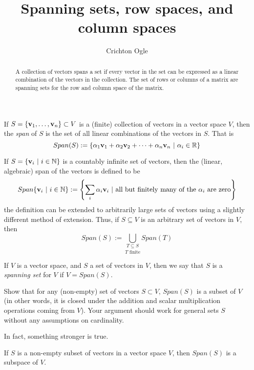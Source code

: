 \documentclass{ximera}
\title{Spanning sets, row spaces, and column spaces}
\author{Crichton Ogle}
\begin{document}
\begin{abstract}
  A collection of vectors spans a set if every vector in the set can
  be expressed as a linear combination of the vectors in the
  collection. The set of rows or columns of a matrix are spanning sets for the row and column space of the matrix.
\end{abstract}
\maketitle

If $S = \{{\bf v}_1,\dots, {\bf v}_n\}\subset V$ is a (finite) collection of vectors in a vector space $V$, then the {\it span} of $S$ is the set of all linear combinations of the vectors in $S$. That is
\[
Span(S) := \{\alpha_1{\bf v}_1 + \alpha_2{\bf v}_2 +\dots +\alpha_n{\bf v}_n\ |\ \alpha_i\in\mathbb R\}
\] 

\begin{remark} If $S = \{{\bf v}_i\ |\ i\in\mathbb N\}$ is a countably infinite set of vectors, then the (linear, algebraic) span of the vectors is defined to be
\[
Span\{{\bf v}_i\ |\ i\in\mathbb N\} := \left\{\sum_i\alpha_i{\bf v}_i\ |\ \text{all but finitely many of the }\alpha_i\text{ are zero}\right\}
\]
the definition can be extended to arbitrarily large sets of vectors using a slightly different method of extension. Thus, if $S\subseteq V$ is an arbitrary set of vectors in $V$, then
\[
Span(S) := \underset{T\text{ finite}}{\underset{T\subseteq S}{\bigcup}} Span(T)
\]
\end{remark}

\begin{definition} If $V$ is a vector space, and $S$ a set of vectors in $V$, then we say that $S$ is a {\it spanning set} for $V$ if $V = Span(S)$.
\end{definition}

\begin{exercise} Show that for any (non-empty) set of vectors $S\subset V$, $Span(S)$ is a subset of $V$ (in other words, it is closed under the addition and scalar multiplication operations coming from $V$). Your argument should work for general sets $S$ without any assumptions on cardinality.
\end{exercise}

In fact, something stronger is true.

\begin{theorem} If $S$ is a non-empty subset of vectors in a vector space $V$, then $Span(S)$ is a subspace of $V$.
\end{theorem}
\end{document}

